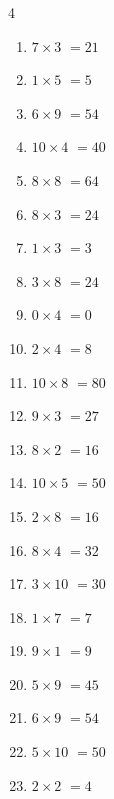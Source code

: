 \begin{multicols}{4}
\begin{enumerate}
  \item $7\times 3$
        $=21$

  \item $1\times 5$
        $=5$

  \item $6\times 9$
        $=54$

  \item $10\times 4$
        $=40$

  \item $8\times 8$
        $=64$

  \item $8\times 3$
        $=24$

  \item $1\times 3$
        $=3$

  \item $3\times 8$
        $=24$

  \item $0\times 4$
        $=0$

  \item $2\times 4$
        $=8$

  \item $10\times 8$
        $=80$

  \item $9\times 3$
        $=27$

  \item $8\times 2$
        $=16$

\columnbreak %

  \item $10\times 5$
        $=50$

  \item $2\times 8$
        $=16$

  \item $8\times 4$
        $=32$

  \item $3\times 10$
        $=30$

  \item $1\times 7$
        $=7$

  \item $9\times 1$
        $=9$

  \item $5\times 9$
        $=45$

  \item $6\times 9$
        $=54$

  \item $5\times 10$
        $=50$

  \item $2\times 2$
        $=4$


\end{enumerate}
\end{multicols}
